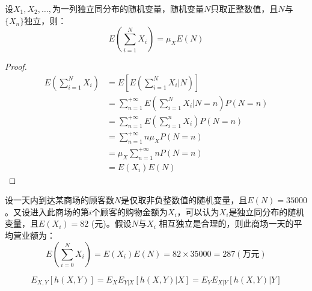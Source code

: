 \begin{proposition}[随机个随机变量和的数学期望]
    设$X_1,X_2,\ldots,$为一列独立同分布的随机变量，随机变量$N$只取正整数值，且$N$与$\{X_n\}$独立，则：
    \[ E\left(\sum_{i=1}^N X_i\right)=\mu_X E(N) \]
\end{proposition}
\begin{proof}
    \begin{align*}
        E\left(\sum_{i=1}^N X_i\right) & =E\left[E\left(\sum_{i=1}^{N} X_{i} | N\right)\right]             \\
                                       & =\sum_{n=1}^{+\infty} E\left(\sum_{i=1}^N X_i | N=n\right) P(N=n) \\
                                       & =\sum_{n=1}^{+\infty} E\left(\sum_{i=1}^n X_i\right) P(N=n)       \\
                                       & =\sum_{n=1}^{+\infty} n \mu_X P(N=n)                              \\
                                       & =\mu_X \sum_{n=1}^{+\infty} n P(N=n)                              \\
                                       & =E(X_i) E(N)
    \end{align*}
\end{proof}
\begin{example}
    设一天内到达某商场的顾客数$N$是仅取非负整数值的随机变量，且$E(N)=35000$。又设进入此商场的第$i$个顾客的购物金额为$X_i$，可以认为$X_i$是独立同分布的随机变量，且$E(X_i)=82$ (元)。假设$N$与$X_i$ 相互独立是合理的，则此商场一天的平均营业额为：
    \[ E\left(\sum_{i=0}^N X_{i}\right)=E(X_i) E(N)=82 \times 35000=287 (\text{万元}) \]
\end{example}

\begin{proposition}[联合期望公式]
    \[ E_{X,Y}[h(X,Y)]=E_X E_{Y|X}[h(X,Y)|X] = E_Y E_{X|Y}[h(X,Y)|Y] \]
\end{proposition}

